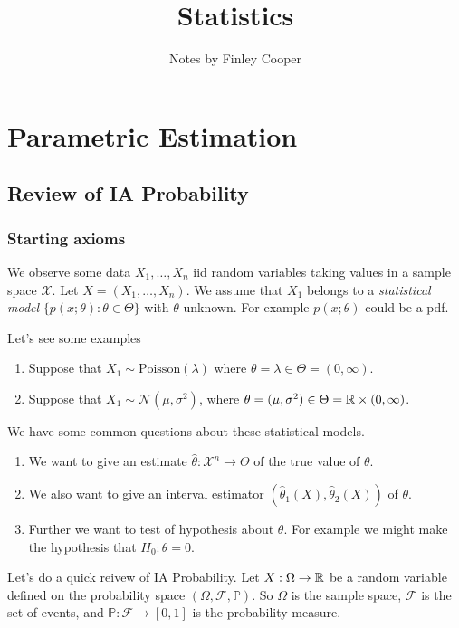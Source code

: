 \documentclass{article}
\title{Statistics}
\author{Notes by Finley Cooper}
\begin{document}
  \maketitle
  \newpage
  \tableofcontents
  \newpage
  \section{Parametric Estimation}
  \subsection{Review of IA Probability}
  \subsubsection{Starting axioms}
  We observe some data $ X_1,\dots, X_n $ iid random variables taking values in a sample space $ \mathcal X $. Let $ X=(X_1,\dots, X_n) $. We assume that $ X_1 $ belongs to a \textit{statistical model} $ \{p(x; \theta):\theta \in \Theta\} $ with $ \theta $ unknown. For example $ p(x;\theta) $ could be a pdf.\par
  Let's see some examples
  \begin{enumerate}
    
	  \item Suppose that $ X_1\sim \text{Poisson}(\lambda) $ where $ \theta=\lambda\in\Theta=(0,\infty) $.

  \item Suppose that $ X_1\sim\mathcal N(\mu,\sigma^2) $, where $ \theta=(\mu,\sigma^2)\in\Theta=\mathbb{R}\times(0,\infty) $.
\end{enumerate}
We have some common questions about these statistical models.
\begin{enumerate}
	\item We want to give an estimate $ \hat{\theta}:\mathcal X^n\to \Theta $ of the true value of $ \theta $.
	\item We also want to give an interval estimator $ (\hat\theta_1(X),\hat\theta_2(X)) $ of $ \theta $.
	\item Further we want to test of hypothesis about $ \theta $. For example we might make the hypothesis that $ H_0:\theta=0 $.
\end{enumerate}
Let's do a quick reivew of IA Probability. Let $ X:\Omega\to \mathbb{R} $ be a random variable defined on the probability space $ (\Omega,\mathcal F, \mathbb P) $. So $ \Omega $ is the sample space, $ \mathcal F $ is the set of events, and $ \mathbb P: \mathcal F\to [0,1] $ is the probability measure.\par
\end{document}
